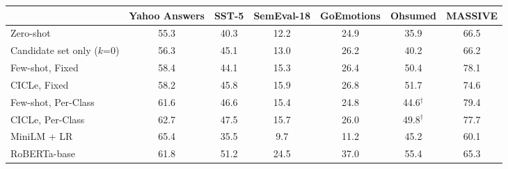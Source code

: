 \begin{tabular}{lcccccc}
\toprule
 & Yahoo Answers & SST-5 & SemEval-18 & GoEmotions & Ohsumed & MASSIVE \\
\midrule
Zero-shot & 55.3 & 40.3 & 12.2 & 24.9 & 35.9 & 66.5 \\
Candidate set only ($k$=0) & 56.3 & 45.1 & 13.0 & 26.2 & 40.2 & 66.2 \\
\midrule
Few-shot, Fixed & 58.4 & 44.1 & 15.3 & 26.4 & 50.4 & 78.1 \\
CICLe, Fixed & 58.2 & 45.8 & 15.9 & 26.8 & 51.7 & 74.6 \\
\midrule
Few-shot, Per-Class & 61.6 & 46.6 & 15.4 & 24.8 & 44.6$^{\dagger}$ & 79.4 \\
CICLe, Per-Class & 62.7 & 47.5 & 15.7 & 26.0 & 49.8$^{\dagger}$ & 77.7 \\
\midrule
MiniLM + LR & 65.4 & 35.5 & 9.7 & 11.2 & 45.2 & 60.1 \\
RoBERTa-base & 61.8 & 51.2 & 24.5 & 37.0 & 55.4 & 65.3 \\
\bottomrule
\end{tabular}
